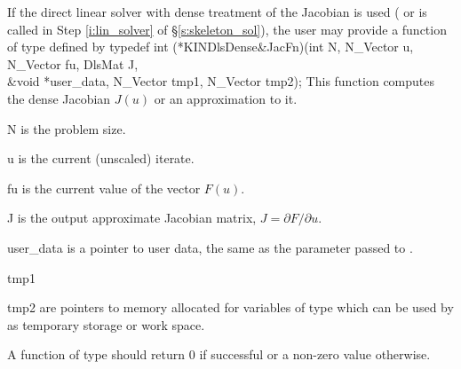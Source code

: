 If the direct linear solver with dense treatment of the Jacobian is used 
( or  is called in Step \ref{i:lin_solver} 
of \S\ref{s:skeleton_sol}), the user may provide a function of type 
 defined by
{
  typedef int (*KINDlsDense&JacFn)(int N, N\_Vector u, N\_Vector fu, DlsMat J, \\
                           &void *user\_data, N\_Vector tmp1, N\_Vector tmp2);
}
{
  This function computes the dense Jacobian $J(u)$ 
  or an approximation to it.
}
{
  \begin{args}
  \item[N]
    is the problem size.
  \item[u]
    is the current (unscaled) iterate.
  \item[fu]
    is the current value of the vector $F(u)$.
  \item[J]
    is the output approximate Jacobian matrix, $J = \partial{F}/\partial{u}$.
  \item[user\_data]
    is a pointer to user data, the same as the       
    parameter passed to .   
  \item[tmp1]
  \item[tmp2]
    are pointers to memory allocated    
    for variables of type  which can be used by           
     as temporary storage or work space.    
  \end{args}
}
{
  A function of type  should return $0$ if successful
  or a non-zero value otherwise.
}
